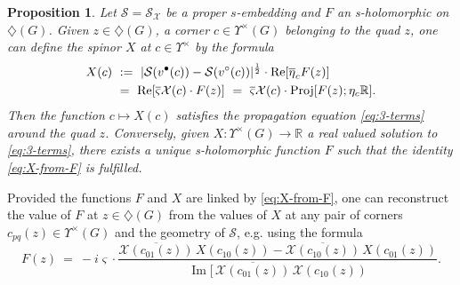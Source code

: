 \documentclass[reqno]{amsart}
\numberwithin{equation}{section}
\newtheorem{proposition}[theo]{Proposition}
\theoremstyle{definition}
\theoremstyle{remark}
\newcommand\R{\mathbb{R}}
\renewcommand\Re{\operatorname{Re}}
\renewcommand\Im{\operatorname{Im}}
\newcommand\cS{\mathcal{S}}
\newcommand\cX{\mathcal{X}}
\newcommand\Dm{\diamondsuit}
\begin{document}
\begin{proposition}\label{prop:shol=3term} Let $\cS=\cS_\cX$ be a proper $s$-embedding and $F$ an s-holomorphic on $\Dm(G)$. Given $z\in\Dm(G)$, a corner \mbox{$c\in\Upsilon^\times(G)$} belonging to the quad $z$, one can define the spinor $X$ at $c \in \Upsilon^\times $ by the formula 
\begin{align}
X(c)\ &:=\ |\cS(v^\bullet(c))-\cS(v^\circ(c))|^{\frac{1}{2}}\cdot\Re[\overline{\eta}_c F(z)] \notag\\
 &=\ \Re[\overline{\varsigma}\cX(c)\cdot F(z)]\ =\ \overline{\varsigma}\cX(c)\cdot \mathrm{Proj}[F(z);\eta_c\R].
\label{eq:X-from-F}
\end{align}
Then the function $c\mapsto X(c) $ satisfies the propagation equation \eqref{eq:3-terms} around the quad $z$. Conversely, given $X:\Upsilon^\times(G)\to\R$ a real valued solution to \eqref{eq:3-terms}, there exists a unique s-holomorphic function $F$ such that the identity \eqref{eq:X-from-F} is fulfilled.
\end{proposition}
Provided the functions $F$ and $X$ are linked by \eqref{eq:X-from-F}, one can reconstruct the value of $F$ at $z\in \diamondsuit (G) $ from the values of $X$ at any pair of corners $c_{pq}(z)\in\Upsilon^\times(G)$ and the geometry of $\cS$, e.g. using the formula \cite[Corollary 2.6]{Che20}
\begin{equation} \label{eq:F-from-X}
F(z)\ =\ -i\varsigma\cdot\frac{\overline{\cX(c_{01}(z))}\,X(c_{10}(z))-\overline{\cX(c_{10}(z))}\,X(c_{01}(z))} {\Im[\,\overline{\cX(c_{01}(z))}\,\cX(c_{10}(z))}.
\end{equation}
\end{document}
